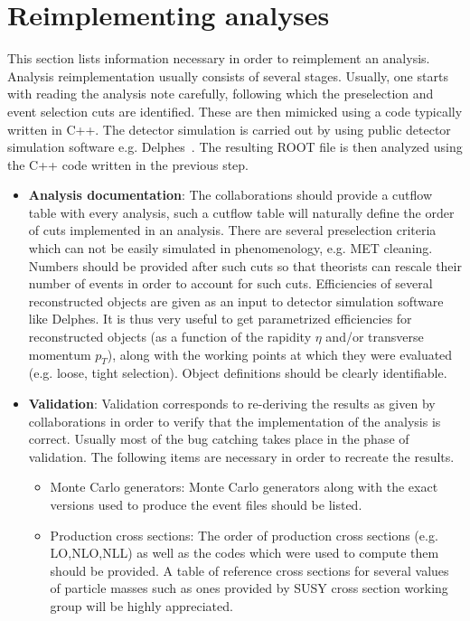 \section{Reimplementing analyses}
This section lists information necessary in order to reimplement an analysis. Analysis reimplementation usually consists of several stages. Usually, one starts with reading the analysis note carefully, following which the preselection and event selection cuts are identified. These are then mimicked using a code typically written in C++. The detector simulation is carried out by using public detector simulation software e.g.  Delphes~\cite{deFavereau:2013fsa}.  The resulting ROOT file is then analyzed using the C++ code written in the previous step.
\begin{itemize}
\item \textbf{Analysis documentation}: The collaborations should provide a cutflow table with every analysis, such a cutflow table will naturally define the order of cuts implemented in an analysis. There are several preselection criteria which can not be easily simulated in phenomenology, e.g. MET cleaning. Numbers should be provided after such cuts so that theorists can rescale their number of events in order to account for such cuts. Efficiencies of several reconstructed objects are given as an input to detector simulation software like Delphes. It is thus very useful to get parametrized efficiencies for reconstructed objects (as a function of the rapidity $\eta$ and/or transverse momentum $p_T$), along with the working points at which they were evaluated (e.g. loose, tight selection). Object definitions should be clearly identifiable. 
\item \textbf{Validation}: Validation corresponds to re-deriving the results as given by collaborations in order to verify that the implementation of the analysis is correct. Usually most of the bug catching takes place in the phase of validation. The following items are necessary in order to recreate the results. 
\begin {itemize}
	\item Monte Carlo generators: Monte Carlo generators along with the exact versions used to produce the event files should be listed. 
	\item Production cross sections: The order of production cross sections (e.g. LO,NLO,NLL) as well as the codes which were used to compute them should be provided. A table of reference cross sections for several values of particle masses such as ones provided by SUSY cross section working group will be highly appreciated.

\end{itemize}
\end{itemize}
